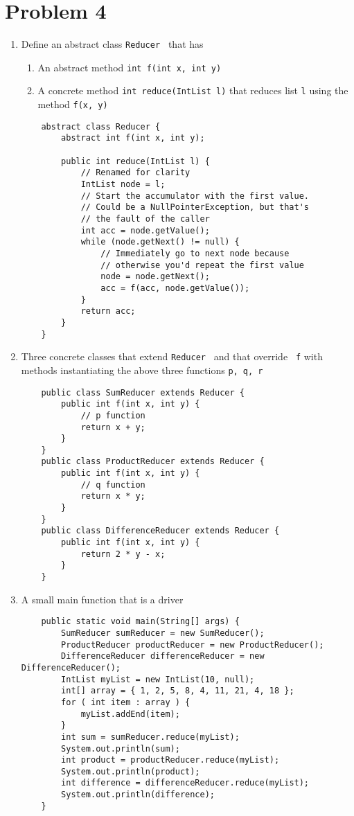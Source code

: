 \documentclass[12pt]{article}
\begin{document}
\section{Problem 4}
\begin{enumerate}
\item Define an abstract class {\tt Reducer } that has
  \begin{enumerate}[label=(\alph*)]
  \item An abstract method {\tt int f(int x, int y)}
  \item A concrete method {\tt int reduce(IntList l)} that reduces list {\tt l}
    using the method {\tt f(x, y) }
  \end{enumerate}
  \begin{verbatim}
    abstract class Reducer {
        abstract int f(int x, int y);
        
        public int reduce(IntList l) {
            // Renamed for clarity
            IntList node = l;
            // Start the accumulator with the first value.
            // Could be a NullPointerException, but that's
            // the fault of the caller
            int acc = node.getValue();
            while (node.getNext() != null) {
                // Immediately go to next node because
                // otherwise you'd repeat the first value
                node = node.getNext();
                acc = f(acc, node.getValue());
            }
            return acc;
        }
    }
  \end{verbatim}
\item Three concrete classes that extend {\tt Reducer } and that override {\tt
  f} with methods instantiating the above three functions {\tt p, q, r}
  \begin{verbatim}
    public class SumReducer extends Reducer {
        public int f(int x, int y) {
            // p function
            return x + y;
        }
    }
    public class ProductReducer extends Reducer {
        public int f(int x, int y) {
            // q function
            return x * y;
        }
    }
    public class DifferenceReducer extends Reducer {
        public int f(int x, int y) {
            return 2 * y - x;
        }
    }
  \end{verbatim}
\item A small main function that is a driver
  \begin{verbatim}
    public static void main(String[] args) {
        SumReducer sumReducer = new SumReducer();
        ProductReducer productReducer = new ProductReducer();
        DifferenceReducer differenceReducer = new DifferenceReducer();
        IntList myList = new IntList(10, null);
        int[] array = { 1, 2, 5, 8, 4, 11, 21, 4, 18 };
        for ( int item : array ) {
            myList.addEnd(item);
        }
        int sum = sumReducer.reduce(myList);
        System.out.println(sum);
        int product = productReducer.reduce(myList);
        System.out.println(product);
        int difference = differenceReducer.reduce(myList);
        System.out.println(difference);
    }
    \end{verbatim}
\end{enumerate}
\end{document}
